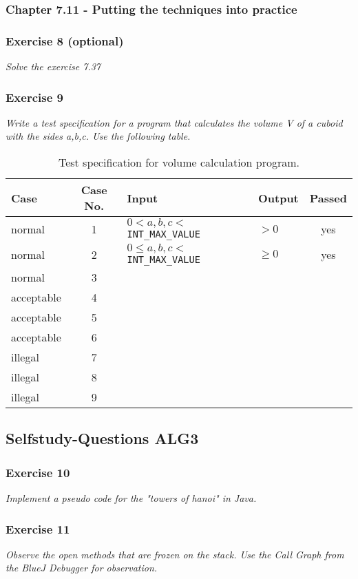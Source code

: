 \subsubsection{Chapter 7.11 - Putting the techniques into practice}

\subsubsection*{Exercise 8 (optional)}
\textit{Solve the exercise 7.37}

\subsubsection*{Exercise 9}
\textit{Write a test specification for a program that calculates the volume V
of a cuboid with the sides a,b,c. Use the following table.}

\begin{table}[h!]
	\centering
	\begin{tabular}{l c p{6cm} p{4cm} c}
	Case & Case No. & Input & Output & Passed \\
	\hline
	normal 		& 1 & $0<a,b,c<$ \lstinline!INT_MAX_VALUE! & $>0$ & yes \\
	normal 		& 2 & $0 \leq a,b,c<$ \lstinline!INT_MAX_VALUE!  & $\geq 0$ & yes \\
	normal 		& 3 & & & \\
	acceptable 	& 4 & & & \\
	acceptable 	& 5 & & & \\
	acceptable 	& 6 & & & \\
	illegal 	& 7 & & & \\
	illegal 	& 8 & & & \\
	illegal 	& 9 & & & \\
	\end{tabular}
	\caption{Test specification for volume calculation program.}
	\label{table:test-specification}
\end{table}


\subsection{Selfstudy-Questions ALG3}

\subsubsection*{Exercise 10}
\textit{Implement a pseudo code for the "towers of hanoi" in Java.} \\



\subsubsection*{Exercise 11}
\textit{Observe the open methods that are frozen on the stack.
Use the Call Graph from the BlueJ Debugger for observation.} \\
